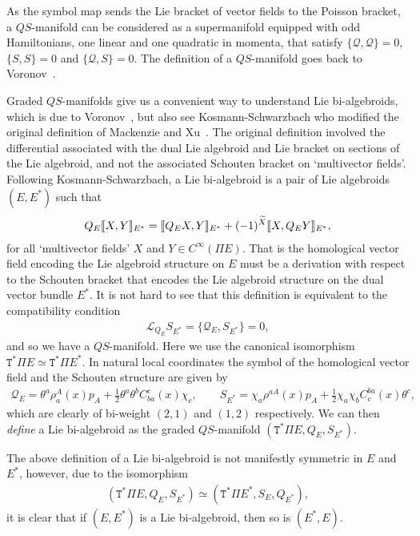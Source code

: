 \documentclass[10pt,a4paper]{amsart}
\newcommand{\Dleft}{[\hspace{-1.5pt}[}
\newcommand{\Dright}{]\hspace{-1.5pt}]}
\newcommand{\SN}[1]{\Dleft #1 \Dright}
\def\sT{{\mathtt T}}
\numberwithin{equation}{section}
\begin{document}
As the symbol map sends the Lie bracket of vector f\/ields to the Poisson bracket, a $QS$-manifold can be considered as a supermanifold equipped with odd Hamiltonians, one linear and one quadratic in momenta, that satisfy $\{\mathcal{Q}, \mathcal{Q} \} =0$,  $\{S,S\}=0$ and $\{ \mathcal{Q}, S\} =0$. The def\/inition of a $QS$-manifold goes back to Voronov~\cite{Voronov:2001qf}.


Graded $QS$-manifolds give us a convenient way to understand Lie bi-algebroids, which is due to Voronov~\cite{Voronov:2001qf}, but also see  Kosmann-Schwarzbach \cite{Kosmann-Schwarzbach:1995}  who modif\/ied the original def\/inition of Mackenzie and  Xu~\cite{Mackenzie:1994}. The original def\/inition involved the dif\/ferential associated with the dual Lie algebroid and Lie bracket on sections of the Lie algebroid, and not the associated  Schouten bracket on `multivector f\/ields'.  Following  Kosmann-Schwarzbach,  a Lie bi-algebroid is a pair of Lie algebroids $(E, E^{*})$ such that
\begin{gather*}
Q_{E}\SN{X,Y}_{E^{*}} = \SN{Q_{E}X, Y}_{E^{*}} + (-1)^{\widetilde{X}}\SN{X, Q_{E} Y}_{E^{*}},
\end{gather*}
for all `multivector f\/ields' $X$ and $Y \in C^{\infty}(\Pi E)$. That is the homological vector f\/ield encoding the Lie algebroid structure on $E$ must be a derivation with respect to the Schouten bracket that encodes the Lie algebroid structure on the dual vector bundle $E^{*}$. It is not hard to see that this def\/inition is equivalent to the compatibility condition
\begin{gather*}
\mathcal{L}_{Q_{E}}S_{E^{*}} = \{ \mathcal{Q}_{E}, S_{E^{*}}\} =0,
\end{gather*}
and so we have a $QS$-manifold.
 Here we use the canonical isomorphism $\sT^{*}\Pi E \simeq \sT^{*}\Pi E^{*}$.
In natural local coordinates the symbol of the homological vector f\/ield and the Schouten structure are given by
\begin{gather*}
\mathcal{Q}_{E}  =  \theta^{a}\rho_{a}^{A}(x)p_{A} + \frac{1}{2} \theta^{a}\theta^{b}C_{ba}^{c}(x) \chi_{c},\qquad
S_{E^{*}}  = \chi_{a}\rho^{aA}(x)p_{A} + \frac{1}{2} \chi_{a}\chi_{b} C^{ba}_{c}(x) \theta^{c},
\end{gather*}
 which are clearly of bi-weight $(2,1)$ and $(1,2)$ respectively. We can then \emph{define} a Lie bi-algebroid as the graded $QS$-manifold $(\sT^{*}\Pi E, Q_{E}, S_{E^{*}})$.

The above def\/inition of a Lie bi-algebroid is not manifestly symmetric in $E$ and $E^{*}$, however, due to the isomorphism
\begin{gather*}
 (\sT^{*}\Pi E,Q_E,S_{E^*} ) \simeq  (\sT^{*}\Pi E^{*},S_E,Q_{E^*} ) ,
\end{gather*}
it is clear that if $(E, E^{*})$ is a Lie bi-algebroid, then so is $(E^{*}, E)$.
\end{document}
